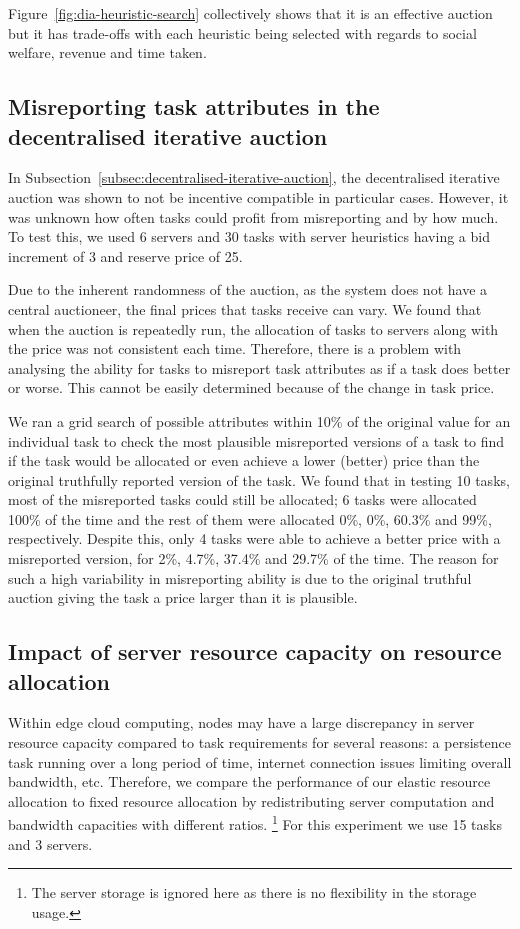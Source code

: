 Figure~\ref{fig:dia-heuristic-search} collectively shows that it is an effective auction but it has trade-offs with each heuristic being selected with regards to social welfare, revenue and time taken. 

\subsection{Misreporting task attributes in the decentralised iterative auction}
\label{subsec:dia-misreport-task-attributes}
In Subsection~\ref{subsec:decentralised-iterative-auction}, the decentralised iterative auction was shown to not be incentive compatible in particular cases. However, it was unknown how often tasks could profit from misreporting and by how much. To test this, we used 6 servers and 30 tasks with server heuristics having a bid increment of 3 and  reserve price of 25.

Due to the inherent randomness of the auction, as the system does not have a central auctioneer, the final prices that tasks receive can vary. We found that when the auction is repeatedly run, the allocation of tasks to servers along with the price was not consistent each time. Therefore, there is a problem with analysing the ability for tasks to misreport task attributes as if a task does better or worse. This cannot be easily determined because of the change in task price.

We ran a grid search of possible attributes within 10\% of the original value for an individual task to check the most plausible misreported versions of a task to find if the task would be allocated or even achieve a lower (better) price than the original truthfully reported version of the task. We found that in testing 10 tasks, most of the misreported tasks could still be allocated; 6 tasks were allocated 100\% of the time and the rest of them were allocated 0\%, 0\%, 60.3\% and 99\%, respectively. Despite this, only 4 tasks were able to achieve a better price with a misreported version, for 2\%, 4.7\%, 37.4\% and 29.7\% of the time. The reason for such a high variability in misreporting ability is due to the original truthful auction giving the task a price larger than it is  plausible. %

\subsection{Impact of server resource capacity on resource allocation}
\label{subsec:server-resource-capacity-ratio}
Within edge cloud computing, nodes may have a large discrepancy in server resource capacity compared to task requirements for several reasons: a persistence task running over a long period of time, internet connection issues limiting overall bandwidth, etc. Therefore, we compare the performance of our elastic resource allocation to fixed resource allocation by redistributing server computation and bandwidth capacities with different ratios. \footnote{The server storage is ignored here as there is no flexibility in the storage usage.} For this experiment we use 15 tasks and 3 servers.

